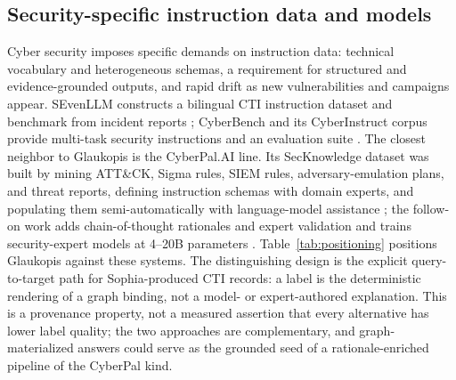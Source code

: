 \documentclass[twocolumn]{svjour3}
\begin{document}
\subsection{Security-specific instruction data and models}\label{sec:bg-security}
Cyber security imposes specific demands on instruction data: technical vocabulary and heterogeneous schemas, a requirement for structured and evidence-grounded outputs, and rapid drift as new vulnerabilities and campaigns appear. SEvenLLM constructs a bilingual CTI instruction dataset and benchmark from incident reports \cite{ji2024sevenllm}; CyberBench and its CyberInstruct corpus provide multi-task security instructions and an evaluation suite \cite{liu2024cyberbench}. The closest neighbor to Glaukopis is the CyberPal.AI line. Its SecKnowledge dataset was built by mining ATT\&CK, Sigma rules, SIEM rules, adversary-emulation plans, and threat reports, defining instruction schemas with domain experts, and populating them semi-automatically with language-model assistance \cite{levi2025cyberpal}; the follow-on work adds chain-of-thought rationales and expert validation and trains security-expert models at 4--20B parameters \cite{levi2025toward}. Table~\ref{tab:positioning} positions Glaukopis against these systems. The distinguishing design is the explicit query-to-target path for Sophia-produced CTI records: a label is the deterministic rendering of a graph binding, not a model- or expert-authored explanation. This is a provenance property, not a measured assertion that every alternative has lower label quality; the two approaches are complementary, and graph-materialized answers could serve as the grounded seed of a rationale-enriched pipeline of the CyberPal kind.
\end{document}
